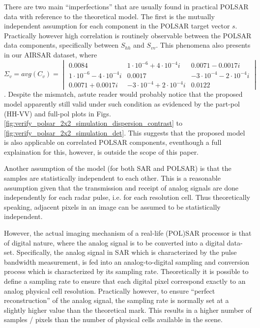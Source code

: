 \documentclass[journal]{IEEEtran}
\begin{document}
There are two main ``imperfections'' that are usually found in practical POLSAR data with reference to the theoretical model.
The first is the mutually independent assumption for each component in the POLSAR target vector $s$.
Practically however high correlation is routinely observable between the POLSAR data components,
  specifically between $S_{hh}$ and $S_{vv}$.
This phenomena also presents in our AIRSAR dataset, where $\Sigma_v = avg(C_v) = \begin{vmatrix} 0.0084 & 1 \cdot 10^{-6} + 4 \cdot 10^{-4} i & 0.0071 - 0.0017 i \\ 1 \cdot 10^{-6} - 4 \cdot 10^{-4} i & 0.0017 & -3 \cdot 10^{-4} - 2 \cdot 10^{-4} i \\ 0.0071 + 0.0017 i & -3 \cdot 10^{-4} + 2 \cdot 10^{-4} i & 0.0122 \end{vmatrix}$.
Despite the mismatch,
  astute reader would probably notice that the proposed model apparently still valid under such condition as evidenced by the part-pol (HH-VV) and full-pol plots in Figs. \ref{fig:verify_polsar_2x2_simulation_dispersion_contrast} to \ref{fig:verify_polsar_2x2_simulation_det}.
This suggests that the proposed model is also applicable on correlated POLSAR components,
  eventhough a full explaination for this, however, is outside the scope of this paper.

Another assumption of the model (for both SAR and POLSAR) is that the samples are statistically independent to each other.
This is a reasonable assumption given that 
  the transmission and receipt of analog signals are done independently for each radar pulse, i.e. for each resolution cell.
Thus theoretically speaking, adjacent pixels in an image can be assumed to be statistically independent.

However, the actual imaging mechanism of a real-life (POL)SAR processor is that of digital nature,
where the analog signal is to be converted into a digital data-set. 
Specifically, the analog signal in SAR 
  which is characterized by the pulse bandwidth measurement,
  is fed into an analog-to-digital sampling and conversion process 
  which is characterized by its sampling rate.
Theoretically it is possible to define a sampling rate to ensure that each digital pixel correspond exactly to an analog physical cell resolution.
Practically however, to ensure ``perfect reconstruction'' of the analog signal, the sampling rate is normally set at a slightly higher value than the theoretical mark.
This results in a higher number of samples / pixels than the number of physical cells available in the scene.  
\end{document}

